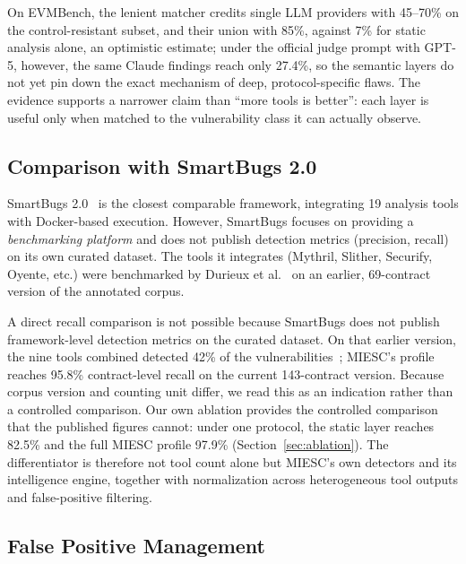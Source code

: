\documentclass[conference]{IEEEtran}
\begin{document}
On EVMBench, the lenient matcher credits single LLM providers with 45--70\% on the control-resistant subset, and their union with 85\%, against 7\% for static analysis alone, an optimistic estimate; under the official judge prompt with GPT-5, however, the same Claude findings reach only 27.4\%, so the semantic layers do not yet pin down the exact mechanism of deep, protocol-specific flaws. The evidence supports a narrower claim than ``more tools is better'': each layer is useful only when matched to the vulnerability class it can actually observe.

\subsection{Comparison with SmartBugs 2.0}

SmartBugs 2.0~\cite{smartbugs2023} is the closest comparable framework, integrating 19 analysis tools with Docker-based execution. However, SmartBugs focuses on providing a \emph{benchmarking platform} and does not publish detection metrics (precision, recall) on its own curated dataset. The tools it integrates (Mythril, Slither, Securify, Oyente, etc.) were benchmarked by Durieux et al.~\cite{durieux2020empirical} on an earlier, 69-contract version of the annotated corpus.

A direct recall comparison is not possible because SmartBugs does not publish framework-level detection metrics on the curated dataset. On that earlier version, the nine tools combined detected 42\% of the vulnerabilities~\cite{durieux2020empirical}; MIESC's profile reaches 95.8\% contract-level recall on the current 143-contract version. Because corpus version and counting unit differ, we read this as an indication rather than a controlled comparison. Our own ablation provides the controlled comparison that the published figures cannot: under one protocol, the static layer reaches 82.5\% and the full MIESC profile 97.9\% (Section~\ref{sec:ablation}). The differentiator is therefore not tool count alone but MIESC's own detectors and its intelligence engine, together with normalization across heterogeneous tool outputs and false-positive filtering.

\subsection{False Positive Management}
\label{sec:fpm}
\end{document}
